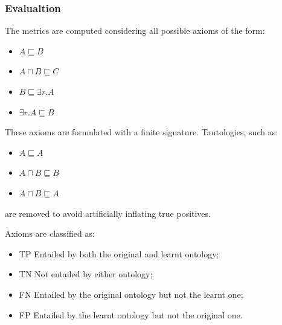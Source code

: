 \documentclass[handout]{beamer}\mode<handout>{\usetheme{AMSBolognaFC}}
\begin{document}
\begin{frame}[c,allowframebreaks]
\frametitle{Evalualtion}

    \vfill

    The metrics are computed considering all possible axioms of the form:
    \begin{itemize}
        \item $A \sqsubseteq B$
        \item $A \sqcap B \sqsubseteq C$
        \item $B \sqsubseteq \exists r.A$
        \item $\exists r.A \sqsubseteq B$
    \end{itemize}

    \vfill

    These axioms are formulated with a finite signature. Tautologies, such as:
    \begin{itemize}
        \item $A \sqsubseteq A$
        \item $A \sqcap B \sqsubseteq B$
        \item $A \sqcap B \sqsubseteq A$
    \end{itemize}
    are removed to avoid artificially inflating true positives.

    \vfill

    \framebreak

    Axioms are classified as:
    \begin{itemize}
        \item \alert{TP} Entailed by both the original and learnt ontology;
        \item \alert{TN} Not entailed by either ontology;
        \item \alert{FN} Entailed by the original ontology but not the learnt one;
        \item \alert{FP} Entailed by the learnt ontology but not the original one.
    \end{itemize}

\end{frame}
\end{document}

